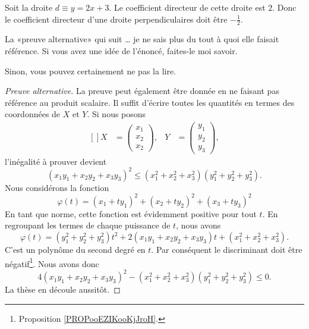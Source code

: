 \begin{example}
	Soit la droite \( d\equiv y=2x+3\). Le coefficient directeur de cette droite est \( 2\). Donc le coefficient directeur d'une droite perpendiculaires doit être \( -\frac{ 1 }{ 2 }\).
\end{example}


\begin{probleme}		\label{PROBooLOEKooZxNpJZ}
	La «preuve alternative» qui suit \ldots{} je ne sais plus du tout à quoi elle faisait référence. Si vous avez une idée de l'énoncé, faites-le moi savoir.

	Sinon, vous pouvez certainement ne pas la lire.
\end{probleme}

\begin{proof}[Preuve alternative]
	La preuve peut également être donnée en ne faisant pas référence au produit scalaire. Il suffit d'écrire toutes les quantités en termes des coordonnées de \( X\) et \( Y\). Si nous posons
	\begin{equation}
		\begin{aligned}[]
			X & =\begin{pmatrix}
				     x_1 \\
				     x_2 \\
				     x_2
			     \end{pmatrix},
			  & Y                & =\begin{pmatrix}
				                        y_1 \\
				                        y_2 \\
				                        y_3
			                        \end{pmatrix},
		\end{aligned}
	\end{equation}
	l'inégalité à prouver devient
	\begin{equation}
		(x_1y_1+x_2y_2+x_3y_3)^2\leq (x_1^2+x_2^2+x_3^2)(y_1^2+y_2^2+y_3^2).
	\end{equation}
	Nous considérons la fonction
	\begin{equation}
		\varphi(t)=(x_1+ty_1)^2+(x_2+ty_2)^2+(x_3+ty_3)^2
	\end{equation}
	En tant que norme, cette fonction est évidemment positive pour tout \( t\). En regroupant les termes de chaque puissance de \( t\), nous avons
	\begin{equation}
		\varphi(t)=(y_1^2+y_2^2+y_3^2)t^2+2(x_1y_1+x_2y_2+x_3y_3)t+(x_1^2+x_2^2+x_3^2).
	\end{equation}
	C'est un polynôme du second degré en \( t\). Par conséquent le discriminant doit être négatif\footnote{Proposition \ref{PROPooEZIKooKjJroH}.}. Nous avons donc
	\begin{equation}
		4(x_1y_1+x_2y_2+x_3y_3)^2-(x_1^2+x_2^2+x_3^2)(y_1^2+y_2^2+y_3^2)\leq 0.
	\end{equation}
	La thèse en découle aussitôt.
\end{proof}


